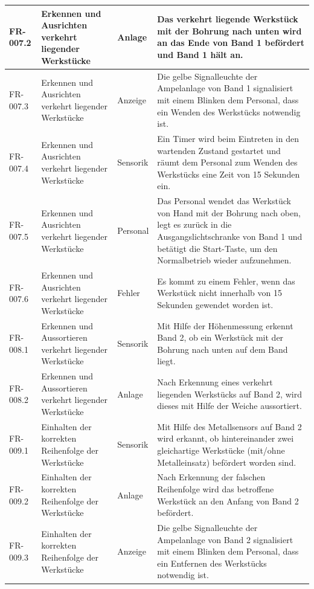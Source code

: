 \documentclass[oneside,a4paper,titlepage]{scrartcl} %
\begin{document}
\begin{small}
\begin{longtable}{|C{2cm}|L{4cm}|C{1.5cm}|L{5.5cm}|}
  \hline
  FR-007.2 & Erkennen und Ausrichten verkehrt liegender Werkstücke & Anlage & Das verkehrt liegende Werkstück mit der Bohrung nach unten wird an das Ende von Band 1 befördert und Band 1 hält an.\\
  \hline
  FR-007.3 & Erkennen und Ausrichten verkehrt liegender Werkstücke & Anzeige & Die gelbe Signalleuchte der Ampelanlage von Band 1 signalisiert mit einem Blinken dem Personal, dass ein Wenden des Werkstücks notwendig ist.\\
  \hline
  FR-007.4 & Erkennen und Ausrichten verkehrt liegender Werkstücke & Sensorik & Ein Timer wird beim Eintreten in den wartenden Zustand gestartet und räumt dem Personal zum Wenden des Werkstücks eine Zeit von 15 Sekunden ein.\\
  \hline
  FR-007.5 & Erkennen und Ausrichten verkehrt liegender Werkstücke & Personal & Das Personal wendet das Werkstück von Hand mit der Bohrung nach oben, legt es zurück in die Ausgangslichtschranke von Band 1 und betätigt die Start-Taste, um den Normalbetrieb wieder aufzunehmen.\\
  \hline
  FR-007.6 & Erkennen und Ausrichten verkehrt liegender Werkstücke & Fehler & Es kommt zu einem Fehler, wenn das Werkstück nicht innerhalb von 15 Sekunden gewendet worden ist.\\
  \hline
   FR-008.1 & Erkennen und Aussortieren verkehrt liegender Werkstücke & Sensorik & Mit Hilfe der Höhenmessung erkennt Band 2, ob ein Werkstück mit der Bohrung nach unten auf dem Band liegt.\\
  \hline
   FR-008.2 & Erkennen und Aussortieren verkehrt liegender Werkstücke & Anlage & Nach Erkennung eines verkehrt liegenden Werkstücks auf Band 2, wird dieses mit Hilfe der Weiche aussortiert.\\
  \hline
  FR-009.1 & Einhalten der korrekten Reihenfolge der Werkstücke & Sensorik & Mit Hilfe des Metallsensors auf Band 2 wird erkannt, ob hintereinander zwei gleichartige Werkstücke (mit/ohne Metalleinsatz) befördert worden sind.\\
  \hline
  FR-009.2 & Einhalten der korrekten Reihenfolge der Werkstücke & Anlage & Nach Erkennung der falschen Reihenfolge wird das betroffene Werkstück an den Anfang von Band 2 befördert.\\
  \hline
  FR-009.3 & Einhalten der korrekten Reihenfolge der Werkstücke & Anzeige & Die gelbe Signalleuchte der Ampelanlage von Band 2 signalisiert mit einem Blinken dem Personal, dass ein Entfernen des Werkstücks notwendig ist.\\

\end{longtable}
\end{small}
\end{document}
